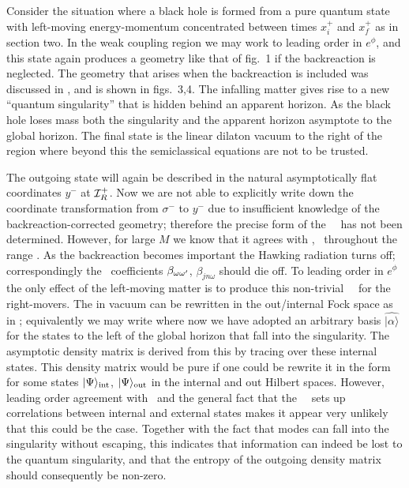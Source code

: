 Consider the situation where a black hole is formed from a pure quantum
state with left-moving energy-momentum concentrated between times $x_i^+$
and $x_f^+$ as in section two.  In the weak coupling region we may work to
leading order in $e^\phi$, and this state again produces a geometry like
that of fig.~1 if the backreaction is neglected.  The geometry that arises
when the backreaction is included was discussed in ,
and is shown in figs.~3,4.  The infalling matter gives rise to a new
``quantum singularity'' that is hidden behind an apparent horizon.  As the
black hole loses mass both the singularity and the apparent horizon
asymptote to the global horizon.  The final state is the linear dilaton
vacuum to the right of the region where
%
\eqn{}
%
beyond this the semiclassical equations are not to be trusted.



The outgoing state will again be described in the natural asymptotically
flat coordinates $y^-$ at ${\cal I}_R^+$.  Now we are not able to
explicitly write down the coordinate transformation
from $\sigma^-$ to $y^-$ due to
insufficient knowledge of the backreaction-corrected geometry; therefore
the precise form of the \Bog\ \Xm\ has not been determined.  However,
for large $M$ we know that it agrees with \wpbog, \bogxm\ throughout the range
\validr.  As the backreaction becomes important the Hawking radiation turns
off; correspondingly the \Bog\ coefficients $\beta_{\omega\omega'}$, $\beta_{jn\omega}$
should die off.  To leading order in $e^\phi$ the only effect of
the left-moving matter is to produce this non-trivial \Bog\ \Xm\ for the
right-movers.  The in vacuum can be rewritten in the out/internal Fock
space as in \vacreln; equivalently we may write
%
\eqn{}
%
where now we have adopted an arbitrary basis $\widehat{|\alpha\rangle}$ for
the states to the left of the global horizon
that fall into the singularity.  The asymptotic density matrix
is derived from this by tracing over these internal states.  This density
matrix would be pure if one  could be rewrite it in the form
%
\eqn{}
%
for some states $|\Psi\rangle_{\rm int}$, $|\Psi\rangle_{\rm out}$ in the
internal and out Hilbert spaces.  However, leading order agreement with
\wfive\ and the general fact that the \Bog\ \Xm\ sets up correlations
between internal and external states makes it appear
very unlikely that this could be the case.  Together with the fact
that modes can fall into the singularity without escaping, this indicates
that information can indeed be lost to the quantum singularity,
and that the entropy of the
outgoing density matrix should consequently be non-zero.

